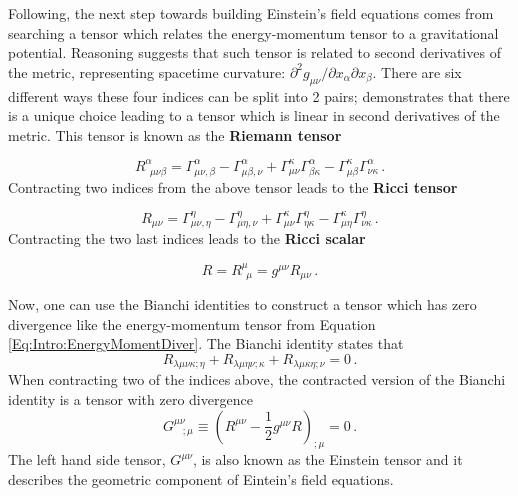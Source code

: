 \qquad Following, the next step towards building Einstein's field equations comes from searching a tensor which relates the energy-momentum tensor to a gravitational potential. Reasoning suggests that such tensor is related to second derivatives of the metric, representing spacetime curvature: $\partial^2 g_{\mu\nu}/\partial x_{\alpha}\partial x_{\beta}$. There are six different ways these four indices can be split into 2 pairs; \cite{Weinberg1972} demonstrates that there is a unique choice leading to a tensor which is linear in second derivatives of the metric. This tensor is known as the \textbf{Riemann tensor} \citep{Peacock}

\begin{equation}
R^{\alpha}_{\ \ \mu\nu\beta} = \Gamma^{\alpha}_{\mu\nu,\beta} - \Gamma^{\alpha}_{\mu\beta, \nu} + \Gamma^{\kappa}_{\mu\nu}\Gamma^{\alpha}_{\beta\kappa} - \Gamma^{\kappa}_{\mu\beta}\Gamma^{\alpha}_{\nu\kappa} \, .
\label{Eq:Intro:Riemman}
\end{equation}
Contracting two indices from the above tensor leads to the \textbf{Ricci tensor}

\begin{equation}
R_{\mu\nu} = \Gamma^{\eta}_{\mu\nu,\eta} - \Gamma^{\eta}_{\mu\eta, \nu} + \Gamma^{\kappa}_{\mu\nu}\Gamma^{\eta}_{\eta\kappa} - \Gamma^{\kappa}_{\mu\eta}\Gamma^{\eta}_{\nu\kappa} \, .
\end{equation}
Contracting the two last indices leads to the \textbf{Ricci scalar}

\begin{equation}
R = R^{\mu}_{\ \ \mu} = g^{\mu\nu}R_{\mu\nu}\, .
\end{equation}

\qquad Now, one can use the Bianchi identities \citep{Weinberg1972,GRAVITATION,dods} to construct a tensor which has zero divergence like the energy-momentum tensor from Equation \eqref{Eq:Intro:EnergyMomentDiver}. The Bianchi identity states that
\begin{equation}
R_{\lambda\mu\nu\kappa;\eta} + R_{\lambda\mu\eta\nu;\kappa} + R_{\lambda\mu\kappa\eta;\nu} = 0 \, .
\end{equation}
When contracting two of the indices above, the contracted version of the Bianchi identity is a tensor with zero divergence
\begin{equation}
G^{\mu\nu}_{\ \ \ \ ; \mu} \equiv \left(R^{\mu\nu} -\frac{1}{2}g^{\mu\nu}R\right)_{;\mu} = 0\, .
\end{equation}
The left hand side tensor, $G^{\mu\nu}$, is also known as the Einstein tensor and it describes the geometric component of Eintein's field equations.

